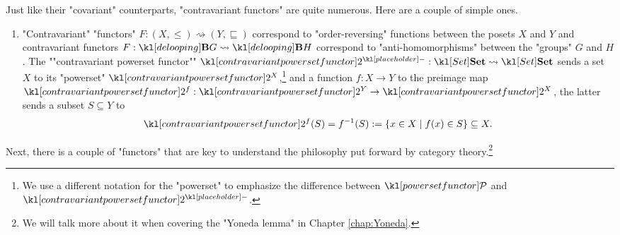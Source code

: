 \documentclass[main.tex]{subfiles}
\begin{document}
\begin{exmps}\label{exmps:contrafunc}
	Just like their "covariant" counterparts, "contravariant functors" are quite numerous. Here are a couple of simple ones.
	\begin{enumerate}
		\item "Contravariant" "functors" $F: (X, \leq) \rightsquigarrow (Y, \sqsubseteq)$ correspond to "order-reversing" functions between the posets $X$ and $Y$ and contravariant functors $F: \deloop{G}\rightsquigarrow \deloop{H}$ correspond to "anti-homomorphisms" between the "groups" $G$ and $H$.
		\itemAP\label{exmp:contrapowerset} The ""contravariant powerset functor"" $\mPcontr{\placeholder}: \catSet \rightsquigarrow \catSet$ sends a set $X$ to its "powerset" $\mPcontr{X}$,\footnote{We use a different notation for the "powerset" to emphasize the difference between $\mPcov$ and $\mPcontr{\placeholder}$.} and a function $f: X\rightarrow Y$ to the preimage map $\mPcontr{f}:\mPcontr{Y}\rightarrow \mPcontr{X}$, the latter sends a subset $S\subseteq Y$ to \[\mPcontr{f}(S) = f^{-1}(S) := \{x \in X \mid f(x) \in S\} \subseteq X.\]
	\end{enumerate}
\end{exmps}
Next, there is a couple of "functors" that are key to understand the philosophy put forward by category theory.\footnote{We will talk more about it when covering the "Yoneda lemma" in Chapter \ref{chap:Yoneda}.}
\end{document}
